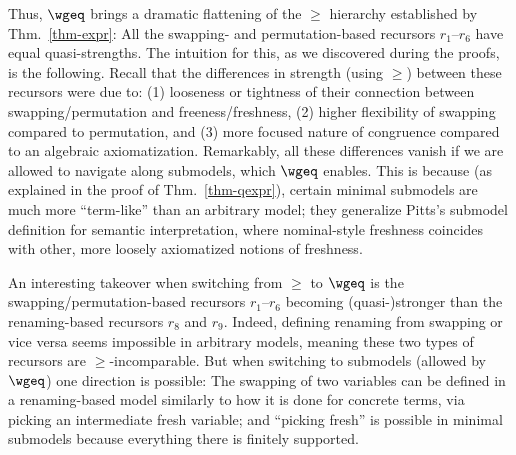 Thus, $\wgeq$  brings a dramatic flattening of the $\geq$ hierarchy established by Thm.~\ref{thm-expr}: %
All the swapping- and permutation-based recursors $r_1$--$r_6$ have equal quasi-strengths. The intuition for this, as we discovered during the proofs, is the following. Recall that the differences in strength (using $\geq$) between these recursors were due to: (1) looseness or tightness of their connection between swapping/permutation and freeness/freshness, (2) higher flexibility of swapping compared to permutation, and (3) more focused nature of congruence compared to an algebraic axiomatization. Remarkably, all these differences vanish if we are allowed to navigate along submodels, which $\wgeq$ enables. 
This is because (as %
explained in the %
proof of Thm.~\ref{thm-qexpr}), 
certain minimal submodels  
are much more ``term-like'' than an arbitrary model; they generalize Pitts's submodel definition for semantic interpretation, where  nominal-style freshness coincides with other, more loosely axiomatized notions of freshness.   

An interesting takeover when switching from $\geq$ to $\wgeq$ 
is the swapping/permutation-based recursors $r_1$--$r_6$ 
becoming \mbox{(quasi-)}stronger 
than the renaming-based recursors $r_8$ and $r_9$. 
Indeed, defining renaming from swapping or vice versa seems impossible in arbitrary models, meaning these two types of recursors are $\geq$-incomparable. But when switching to submodels (allowed by $\wgeq$) one direction is %
possible: The %
swapping of two variables %
can be defined in a renaming-based model similarly to how it is done for concrete terms, via picking an intermediate 
fresh variable; %
and ``picking fresh'' is possible in %
minimal submodels because everything there is finitely supported. 

